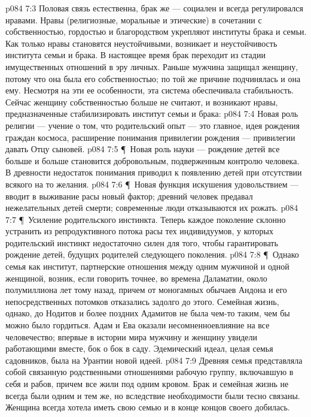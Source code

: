 \vs p084 7:3 Половая связь естественна, брак же --- социален и всегда регулировался нравами. Нравы (религиозные, моральные и этические) в сочетании с собственностью, гордостью и благородством укрепляют институты брака и семьи. Как только нравы становятся неустойчивыми, возникает и неустойчивость института семьи и брака. В настоящее время брак переходит из стадии имущественных отношений в эру личных. Раньше мужчина защищал женщину, потому что она была его собственностью; по той же причине подчинялась и она ему. Несмотря на эти ее особенности, эта система обеспечивала стабильность. Сейчас женщину собственностью больше не считают, и возникают нравы, предназначенные стабилизировать институт семьи и брака:
\vs p084 7:4 \bibnobreakspace Новая роль религии --- учение о том, что родительский опыт --- это главное, идея рождения граждан космоса, расширение понимания привилегии рождения --- привилегии давать Отцу сыновей.
\vs p084 7:5 \P\ \bibnobreakspace Новая роль науки --- рождение детей все больше и больше становится добровольным, подверженным контролю человека. В древности недостаток понимания приводил к появлению детей при отсутствии всякого на то желания.
\vs p084 7:6 \P\ \bibnobreakspace Новая функция искушения удовольствием --- вводит в выживание расы новый фактор; древний человек предавал нежелательных детей смерти; современные люди отказываются их рожать.
\vs p084 7:7 \P\ \bibnobreakspace Усиление родительского инстинкта. Теперь каждое поколение склонно устранить из репродуктивного потока расы тех индивидуумов, у которых родительский инстинкт недостаточно силен для того, чтобы гарантировать рождение детей, будущих родителей следующего поколения.
\vs p084 7:8 \P\ Однако семья как институт, партнерские отношения между одним мужчиной и одной женщиной, возник, если говорить точнее, во времена Даламатии, около полумиллиона лет тому назад, причем от моногамных обычаев Андона и его непосредственных потомков отказались задолго до этого. Семейная жизнь, однако, до Нодитов и более поздних Адамитов не была чем\hyp{}то таким, чем бы можно было гордиться. Адам и Ева оказали несомненноевлияние на все человечество; впервые в истории мира мужчину и женщину увидели работающими вместе, бок о бок в саду. Эдемический идеал, целая семья садовников, была на Урантии новой идеей.
\vs p084 7:9 Древняя семья представляла собой связанную родственными отношениями рабочую группу, включавшую в себя и рабов, причем все жили под одним кровом. Брак и семейная жизнь не всегда были одним и тем же, но вследствие необходимости были тесно связаны. Женщина всегда хотела иметь свою семью и в конце концов своего добилась.
